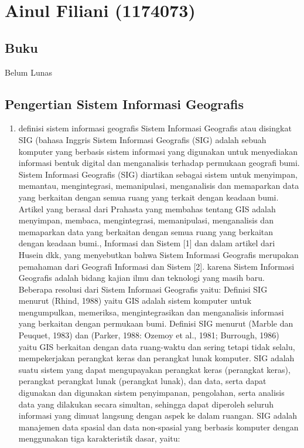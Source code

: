 \section{Ainul Filiani (1174073)}
\subsection{Buku}
Belum Lunas 
\subsection{Pengertian Sistem Informasi Geografis}
\begin{enumerate}
\item definisi sistem informasi geografis 
Sistem Informasi Geografis atau disingkat SIG (bahasa Inggris Sistem Informasi Geografis (SIG) adalah sebuah komputer yang berbasis sistem informasi yang digunakan untuk menyediakan informasi bentuk digital dan menganalisis terhadap permukaan geografi bumi. Sistem Informasi Geografis (SIG) diartikan sebagai sistem untuk menyimpan, memantau, mengintegrasi, memanipulasi, menganalisis dan memaparkan data yang berkaitan dengan semua ruang yang terkait dengan keadaan bumi. Artikel yang berasal dari Prahasta yang membahas tentang GIS adalah menyimpan, membaca, mengintegrasi, memanipulasi, menganalisis dan memaparkan data yang berkaitan dengan semua ruang yang berkaitan dengan keadaan bumi., Informasi dan Sistem 
[1] dan dalam artikel dari Husein dkk, yang menyebutkan bahwa Sistem Informasi Geografis merupakan pemahaman dari Geografi Informasi dan Sistem [2].
karena Sistem Informasi Geografis adalah bidang kajian ilmu dan teknologi yang masih baru. Beberapa resolusi dari Sistem Informasi Geografis yaitu:
Definisi SIG menurut (Rhind, 1988) yaitu GIS adalah sistem komputer untuk mengumpulkan, memeriksa, mengintegrasikan dan menganalisis informasi yang berkaitan dengan permukaan bumi. 
Definisi SIG menurut (Marble dan Peuquet, 1983) dan (Parker, 1988: Ozemoy et al., 1981; Burrough, 1986) yaitu GIS berkaitan dengan data ruang-waktu dan sering tetapi tidak selalu, mempekerjakan perangkat keras dan perangkat lunak komputer.
SIG adalah suatu sistem yang dapat mengupayakan perangkat keras (perangkat keras), perangkat perangkat lunak (perangkat lunak), dan data, serta dapat digunakan dan digunakan sistem penyimpanan, pengolahan, serta analisis data yang dilakukan secara simultan, sehingga dapat diperoleh seluruh informasi yang dimuat langsung dengan aspek ke dalam ruangan.  SIG adalah manajemen data spasial dan data non-spasial yang berbasis komputer dengan menggunakan tiga karakteristik dasar, yaitu: 
\end{enumerate}
